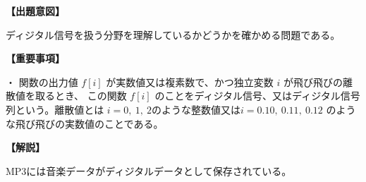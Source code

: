 \noindent \textbf{【出題意図】}

\noindent ディジタル信号を扱う分野を理解しているかどうかを確かめる問題である。

\vspace{1em}
\noindent \textbf{【重要事項】}

\medskip
\noindent ・ 関数の出力値 $f[i]$ が実数値又は複素数で、かつ独立変数 $i$ が飛び飛びの離散値を取るとき、 この関数 $f[i]$ のことをディジタル信号、又はディジタル信号列という。離散値とは $i=0,\ 1,\ 2$のような整数値又は$i=0.10,\ 0.11,\ 0.12$ のような飛び飛びの実数値のことである。

\vspace{1em}
\noindent \textbf{【解説】}

\noindent MP3には音楽データがディジタルデータとして保存されている。
